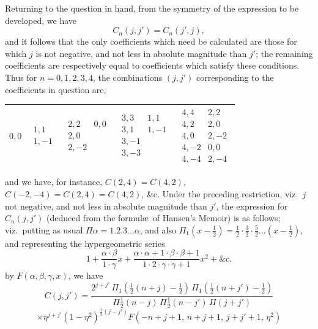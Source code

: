 \documentclass[12pt,a4paper]{article}
\theoremstyle{plain}
\begin{document}
\medskip

Returning to the question in hand, from the symmetry of the expression to be developed, we have
\[
C_{n}(j,j')=C_{n}(j',j),
\]
and it follows that the only coefficients which need be calculated are those for which $j$ is not negative, and not less in absolute magnitude than $j'$; the remaining coefficients are respectively equal to coefficients which satisfy these conditions. Thus for $n=0,1,2,3,4$, the combinations $(j,j')$ corresponding to the coefficients in question are,

\begin{center}
\small
\setlength{\tabcolsep}{4pt}
\begin{tabular}{|c|c|c|c|c|}
\hline
$0,0$ &
$\begin{array}{c}1,1\\ 1,-1\end{array}$ &
$\begin{array}{cc}2,2 & 0,0\\ 2,0 &\\ 2,-2 &\end{array}$ &
$\begin{array}{cc}3,3 & 1,1\\ 3,1 & 1,-1\\ 3,-1 &\\ 3,-3 &\end{array}$ &
$\begin{array}{cc}4,4 & 2,2\\ 4,2 & 2,0\\ 4,0 & 2,-2\\ 4,-2 & 0,0\\ 4,-4 & 2,-4\end{array}$ \\
\hline
\end{tabular}
\end{center}

\medskip

and we have, for instance, $C(2,4)=C(4,2)$, $C(-2,-4)=C(2,4)=C(4,2)$, \&c. Under the preceding restriction, viz.\ $j$ not negative, and not less in absolute magnitude than $j'$, the expression for $C_{n}(j,j')$ (deduced from the formul\ae\ of Hansen's Memoir) is as follows; viz.\ putting as usual $\Pi\alpha=1.2.3\ldots\alpha$, and also $\Pi_{1}(x-\tfrac{1}{2})=\tfrac{1}{2}\cdot\tfrac{3}{2}\cdot\tfrac{5}{2}\ldots(x-\tfrac{1}{2})$, and representing the hypergeometric series
\[
1+\frac{\alpha\cdot\beta}{1\cdot\gamma}x+\frac{\alpha\cdot\alpha+1\cdot\beta\cdot\beta+1}{1\cdot 2\cdot\gamma\cdot\gamma+1}x^{2}+\&\mathrm{c}.
\]
by $F(\alpha,\beta,\gamma,x)$, we have
\[
C(j,j')=\frac{2^{j+j'}\,\Pi_{1}(\tfrac{1}{2}(n+j)-\tfrac{1}{2})\,\Pi_{1}(\tfrac{1}{2}(n+j')-\tfrac{1}{2})}{\Pi\tfrac{1}{2}(n-j)\,\Pi\tfrac{1}{2}(n-j')\,\Pi(j+j')}
\]
\[
\times\eta^{j+j'}(1-\eta^{2})^{\tfrac{1}{2}(j-j')}F(-n+j+1,\,n+j+1,\,j+j'+1,\,\eta^{2})
\]
\end{document}

